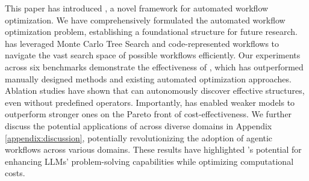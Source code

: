 
This paper has introduced \model, a novel framework for automated workflow optimization. We have comprehensively formulated the automated workflow optimization problem, establishing a foundational structure for future research. \model has leveraged Monte Carlo Tree Search and code-represented workflows to navigate the vast search space of possible workflows efficiently. Our experiments across six benchmarks demonstrate the effectiveness of \model, which has outperformed manually designed methods and existing automated optimization approaches. Ablation studies have shown that \model can autonomously discover effective structures, even without predefined operators. Importantly, \model has enabled weaker models to outperform stronger ones on the Pareto front of cost-effectiveness. We further discuss the potential applications of \model across diverse domains in Appendix \ref{appendix:discussion}, potentially revolutionizing the adoption of agentic workflows across various domains. These results have highlighted \model's potential for enhancing LLMs' problem-solving capabilities while optimizing computational costs.